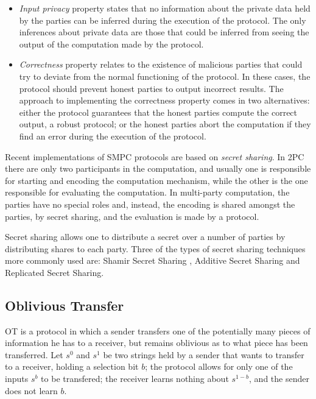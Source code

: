 \begin{itemize}
    \setlength\itemsep{1em}

    \item \textit{Input privacy} property states that no information about the private data held by the parties can be inferred during the execution of the protocol. The only inferences about private data are those that could be inferred from seeing the output of the computation made by the protocol.

    \item \textit{Correctness} property relates to the existence of malicious parties that could try to deviate from the normal functioning of the protocol. In these cases, the protocol should prevent honest parties to output incorrect results. The approach to implementing the correctness property comes in two alternatives: either the protocol guarantees that the honest parties compute the correct output, a robust protocol; or the honest parties abort the computation if they find an error during the execution of the protocol.
\end{itemize}

Recent implementations of \ac{SMPC} protocols are based on \textit{secret sharing}. In 2PC there are only two participants in the computation, and usually one is responsible for starting and encoding the computation mechanism, while the other is the one responsible for evaluating the computation. In multi-party computation, the parties have no special roles and, instead, the encoding is shared amongst the parties, by secret sharing, and the evaluation is made by a protocol.

Secret sharing allows one to distribute a secret over a number of parties by distributing shares to each party. Three of the types of secret sharing techniques more commonly used are: Shamir Secret Sharing \cite{shamir1979share}, Additive Secret Sharing and Replicated Secret Sharing.


\subsection{Oblivious Transfer}
\label{ssec:ObliviousTransfer}


\acf{OT} \cite{rabin2005exchange} is a protocol in which a sender transfers one of the potentially many pieces of information he has to a receiver, but remains oblivious as to what piece has been transferred. Let $s^0$ and $s^1$ be two strings held by a sender that wants to transfer to a receiver, holding a selection bit $b$; the protocol allows for only one of the inputs $s^b$ to be transfered; the receiver learns nothing about $s^{1-b}$, and the sender does not learn $b$. 

